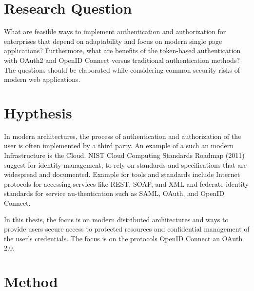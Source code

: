 \section{Research Question}
What are feasible ways to implement authentication and authorization for enterprises that depend on adaptability and focus on modern single page applications? Furthermore, what are benefits of the token-based authentication with OAuth2 and OpenID Connect versus traditional authentication methods? The questions should be elaborated while considering common security risks of modern web applications.

\section{Hypthesis}

In modern architectures, the process of authentication and authorization of the user is often implemented by a third party. An example of a such an modern Infrastructure is the Cloud. NIST Cloud Computing Standards Roadmap (2011) suggest for identity management, to rely on standards and specifications that are widespread and documented. Example for tools and standards include Internet protocols for accessing services like REST, SOAP, and XML and federate identity standards for service au-thentication such as SAML, OAuth, and OpenID Connect.

In this thesis, the focus is on modern distributed architectures and ways to provide users secure access to protected resources and confidential management of the user’s credentials. The focus is on the protocols OpenID Connect an OAuth 2.0. 


\section{Method}







\chapterend
